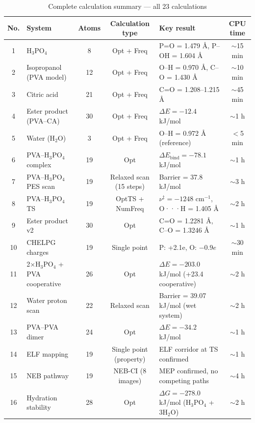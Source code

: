 \documentclass[12pt,a4paper]{report}
\begin{document}
\begin{table}[h!]
\centering
\footnotesize   %
\setlength{\tabcolsep}{3pt}  %
\caption{Complete calculation summary — all 23 calculations}
\label{tab:calc-summary}
\begin{tabular}{c l c c l c}
\toprule
No. & System & Atoms & Calculation type & Key result & CPU time \\
\midrule
1 & H\(_3\)PO\(_4\) & 8 & Opt + Freq & P=O = 1.479 Å, P–OH = 1.604 Å & \(\sim\)15 min \\
2 & Isopropanol (PVA model) & 12 & Opt + Freq & O–H = 0.970 Å, C–O = 1.430 Å & \(\sim\)10 min \\
3 & Citric acid & 21 & Opt + Freq & C=O = 1.208–1.215 Å & \(\sim\)45 min \\
4 & Ester product (PVA–CA) & 30 & Opt + Freq & \(\Delta E = -12.4\) kJ/mol & \(\sim\)1 h \\
5 & Water (H\(_2\)O) & 3 & Opt + Freq & O–H = 0.972 Å (reference) & \(<\)5 min \\
6 & PVA–H\(_3\)PO\(_4\) complex & 19 & Opt & \(\Delta E_{\text{bind}} = -78.1\) kJ/mol & \(\sim\)1 h \\
7 & PVA–H\(_3\)PO\(_4\) PES scan & 19 & Relaxed scan (15 steps) & Barrier = 37.8 kJ/mol & \(\sim\)3 h \\
8 & PVA–H\(_3\)PO\(_4\) TS & 19 & OptTS + NumFreq & \(\nu^{\ddagger} = -1248\) cm\(^{-1}\), O···H = 1.405 Å & \(\sim\)2 h \\
9 & Ester product v2 & 30 & Opt & C=O = 1.2281 Å, C–O = 1.3246 Å & \(\sim\)1 h \\
10 & CHELPG charges & 19 & Single point & P: +2.1e, O: \(-0.9e\) & \(\sim\)30 min \\
11 & 2\(\times\)H\(_3\)PO\(_4\) + PVA cooperative & 26 & Opt & \(\Delta E = -203.0\) kJ/mol (+23.4 cooperative) & \(\sim\)2 h \\
12 & Water proton scan & 22 & Relaxed scan & Barrier = 39.07 kJ/mol (wet system) & \(\sim\)2 h \\
13 & PVA–PVA dimer & 24 & Opt & \(\Delta E = -34.2\) kJ/mol & \(\sim\)1 h \\
14 & ELF mapping & 19 & Single point (property) & ELF corridor at TS confirmed & \(\sim\)1 h \\
15 & NEB pathway & 19 & NEB-CI (8 images) & MEP confirmed, no competing paths & \(\sim\)4 h \\
16 & Hydration stability & 28 & Opt & \(\Delta G = -278.0\) kJ/mol (H\(_3\)PO\(_4\) + 3H\(_2\)O) & \(\sim\)2 h \\

\end{tabular}
\end{table}
\end{document}
